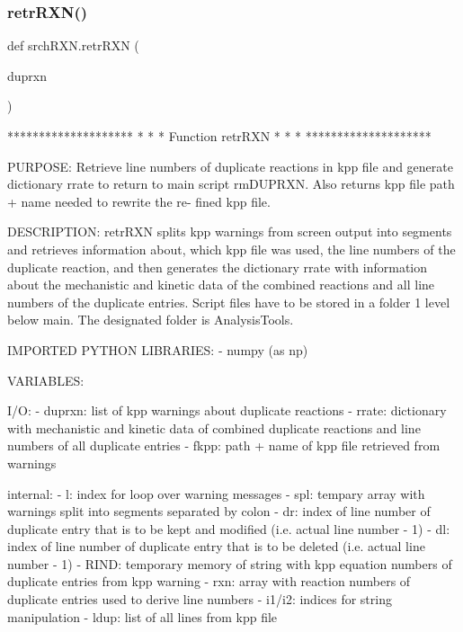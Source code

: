 \subsubsection{\texorpdfstring{retr\+R\+X\+N()}{retrRXN()}}
{\footnotesize\ttfamily def srch\+R\+X\+N.\+retr\+R\+XN (\begin{DoxyParamCaption}\item[{}]{duprxn }\end{DoxyParamCaption})}

\begin{DoxyVerb}********************
*                  *
* Function retrRXN *
*                  *
********************

PURPOSE:
    Retrieve line numbers of duplicate reactions in kpp file and
    generate dictionary rrate to return to main script rmDUPRXN.
    Also returns kpp file path + name needed to rewrite the re-
    fined kpp file.


DESCRIPTION:
    retrRXN splits kpp warnings from screen output into segments
    and retrieves information about, which kpp file was used, the
    line numbers of the duplicate reaction, and then generates the
    dictionary rrate with information about the mechanistic and
    kinetic data of the combined reactions and all line numbers
    of the duplicate entries.
    Script files have to be stored in a folder 1 level below main.
    The designated folder is AnalysisTools.


IMPORTED PYTHON LIBRARIES:
    - numpy (as np)


VARIABLES:

I/O:
    - duprxn:   list of kpp warnings about duplicate reactions
    - rrate:    dictionary with mechanistic and kinetic data of
                combined duplicate reactions and line numbers of
                all duplicate entries
    - fkpp:     path + name of kpp file retrieved from warnings

internal:
    - l:        index for loop over warning messages
    - spl:      tempary array with warnings split into segments
                separated by colon
    - dr:       index of line number of duplicate entry that is
                to be kept and modified (i.e. actual line number - 1)
    - dl:       index of line number of duplicate entry that is
                to be deleted (i.e. actual line number - 1)
    - RIND:     temporary memory of string with kpp equation
                numbers of duplicate entries from kpp warning
    - rxn:      array with reaction numbers of duplicate entries
                used to derive line numbers
    - i1/i2:    indices for string manipulation
    - ldup:     list of all lines from kpp file\end{DoxyVerb}
 
